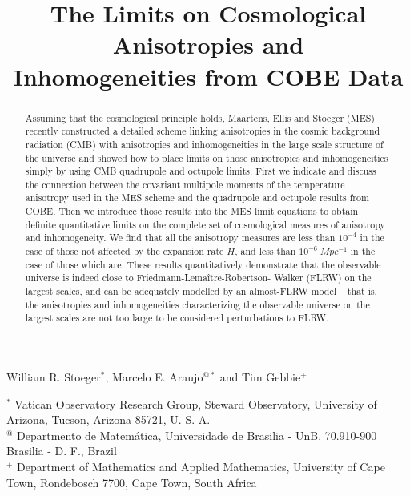 \newcommand\bc{\begin{center}}
\newcommand\ec{\end{center}}
\title{The Limits on Cosmological Anisotropies and \\ Inhomogeneities from
	COBE Data}
\author{}
\date{}

\maketitle
\bc
William R. Stoeger$^*$, Marcelo E. Araujo$^{@*}$ and Tim Gebbie$^+$
\ec
\medskip
$^*$ Vatican Observatory Research Group, Steward Observatory, University of
Arizona, Tucson, Arizona  85721, U. S. A. \\

\noindent
$^@$ Departmento de Matem\'{a}tica, Universidade de Brasilia - UnB, 
70.910-900 Brasilia - D. F., Brazil  \\

\noindent
$^+$ Department of Mathematics and Applied Mathematics, University of 
Cape Town, Rondebosch 7700, Cape Town, South Africa

\begin{abstract}
Assuming that the cosmological principle holds, Maartens, Ellis and Stoeger
(MES) recently constructed a detailed scheme
linking anisotropies in the
cosmic background radiation (CMB) with anisotropies and inhomogeneities in the
large scale structure of the universe and showed how to place limits on those
anisotropies and inhomogeneities simply by using CMB quadrupole and octupole 
limits. First we indicate and discuss the connection between the covariant 
multipole moments of the temperature anisotropy used in the MES scheme and 
the quadrupole
and octupole results from COBE. Then we introduce those results into the
MES limit equations to obtain definite quantitative limits on the complete
set of cosmological measures of anisotropy and inhomogeneity. We find that 
all the anisotropy measures are less than $10^{-4}$ in the case of those
not affected by the expansion rate $H$, and less than $10^{-6} \; Mpc^{-1}$ in 
the case of those which are. These results quantitatively demonstrate that
the observable universe is indeed close to Friedmann-Lema\^{i}tre-Robertson-
Walker (FLRW) on the largest scales, and can be adequately modelled by an
almost-FLRW model -- that is, the anisotropies and inhomogeneities
characterizing the observable universe on the largest scales are not too
large to be considered perturbations to FLRW.
\end{abstract}

